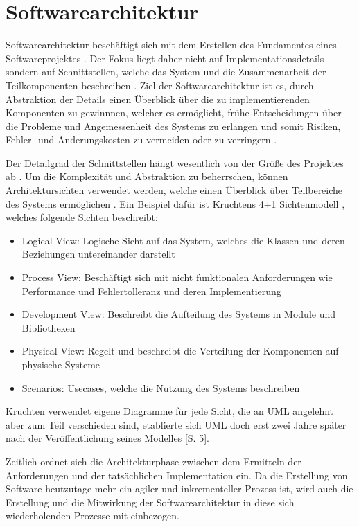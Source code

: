 \chapter{Softwarearchitektur}
Softwarearchitektur beschäftigt sich mit dem Erstellen des Fundamentes eines Softwareprojektes \cite[S. 9]{softarch}. Der Fokus liegt daher nicht auf Implementationsdetails sondern auf Schnittstellen, welche das System und die Zusammenarbeit der Teilkomponenten beschreiben \cite[S. 8]{basiswissen}. Ziel der Softwarearchitektur ist es, durch Abstraktion der Details einen Überblick über die zu implementierenden Komponenten zu gewinnnen, welcher es ermöglicht, frühe Entscheidungen über die Probleme und Angemessenheit des Systems zu erlangen und somit Risiken, Fehler- und Änderungskosten zu vermeiden oder zu verringern \cite[S. 10]{softarch}.

Der Detailgrad der Schnittstellen hängt wesentlich von der Größe des Projektes ab \cite[S. 7-12]{basiswissen}. Um die Komplexität und Abstraktion zu beherrschen, können Architektursichten verwendet werden, welche einen Überblick über Teilbereiche des Systems ermöglichen \cite{ISO_ARCH}. Ein Beispiel dafür ist Kruchtens 4+1 Sichtenmodell \cite{kruch}, welches folgende Sichten beschreibt:

\begin{itemize}
  \item Logical View: Logische Sicht auf das System, welches die Klassen und deren Beziehungen untereinander darstellt
  \item Process View: Beschäftigt sich mit nicht funktionalen Anforderungen wie Performance und Fehlertolleranz und deren Implementierung
  \item Development View: Beschreibt die Aufteilung des Systems in Module und Bibliotheken
  \item Physical View: Regelt und beschreibt die Verteilung der Komponenten auf physische Systeme
  \item Scenarios: Usecases, welche die Nutzung des Systems beschreiben
\end{itemize}

Kruchten verwendet eigene Diagramme für jede Sicht, die an UML angelehnt aber zum Teil verschieden sind, etablierte sich UML doch erst zwei Jahre später nach der Veröffentlichung seines Modelles \cite{glasklar}[S. 5].

Zeitlich ordnet sich die Architekturphase zwischen dem Ermitteln der Anforderungen und der tatsächlichen Implementation ein. Da die Erstellung von Software heutzutage mehr ein agiler und inkrementeller Prozess ist, wird auch die Erstellung und die Mitwirkung der Softwarearchitektur in diese sich wiederholenden Prozesse mit einbezogen. \cite[S. 7]{basiswissen}


